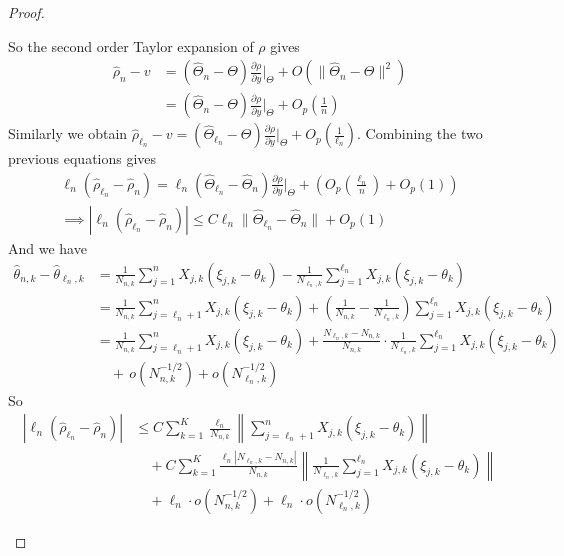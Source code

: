 \begin{proof}
\begin{enumerate}[label=(\roman*)]
		So the second order Taylor expansion of \(\rho\) gives
		\begin{align}
			\hat{\rho}_n - v  &= (\hat{\Theta}_n-\Theta)\frac{\partial \rho}{\partial y}\Big|_{\Theta} + O(\|\hat{\Theta}_n-\Theta\|^2) \\
			&= (\hat{\Theta}_n-\Theta)\frac{\partial \rho}{\partial y}\Big|_{\Theta} + O_p\left(\frac{1}{n}\right) \label{eq:approx-rho-Op}
		\end{align}
		Similarly we obtain \(		\hat{\rho}_{\ell_n} - v = (\hat{\Theta}_{\ell_n}-\Theta)\frac{\partial \rho}{\partial y}\Big|_{\Theta} + O_p\left(\frac{1}{\ell_n}\right)
		\).	Combining the two previous equations gives
		\begin{eqnarray*}
			\ell_n(\hat{\rho}_{\ell_n}-\hat{\rho}_n) = \ell_n(\hat{\Theta}_{\ell_n}-\hat{\Theta}_n)\frac{\partial \rho}{\partial y}\Big|_{\Theta} + \left(O_p\left(\frac{\ell_n}{n}\right)+O_p(1)\right) \\
			\implies |\ell_n(\hat{\rho}_{\ell_n}-\hat{\rho}_n)| \le C \ell_n \|\hat{\Theta}_{\ell_n}-\hat{\Theta}_n\| + O_p(1)
		\end{eqnarray*}
		And we have	
		\begin{align*}
			\hat{\theta}_{n,k}-\hat{\theta}_{\ell_n,k} &= \frac{1}{N_{n,k}}\sum_{j=1}^{n}X_{j,k}(\xi_{j,k}-\theta_k)-\frac{1}{N_{\ell_n,k}}\sum_{j=1}^{\ell_n}X_{j,k}(\xi_{j,k}-\theta_k)\\
			&= \frac{1}{N_{n,k}}\sum_{j=\ell_n+1}^{n} X_{j,k}(\xi_{j,k}-\theta_k) + \left(\frac{1}{N_{n,k}} - \frac{1}{N_{\ell_n,k}}\right)\sum_{j=1}^{\ell_n}X_{j,k}(\xi_{j,k}-\theta_k)\\[8pt]
			&= \frac{1}{N_{n,k}}\sum_{j=\ell_n+1}^{n}X_{j,k}(\xi_{j,k}-\theta_k) + \frac{N_{\ell_n,k}-N_{n,k}}{N_{n,k}}\cdot\frac{1}{N_{\ell_n,k}}\sum_{j=1}^{\ell_n}X_{j,k}(\xi_{j,k}-\theta_k)\\[8pt]
			&\quad +\, o\left(N_{n,k}^{-1/2}\right) + o\left(N_{\ell_n,k}^{-1/2}\right)
		\end{align*}
		So
		\begin{align*}
			|\ell_n(\hat{\rho}_{\ell_n}-\hat{\rho}_n)| &\le C\sum_{k=1}^{K}\frac{\ell_n}{N_{n,k}}\left\|\sum_{j=\ell_n+1}^{n}X_{j,k}(\xi_{j,k}-\theta_k)\right\|\\
			&\quad + C\sum_{k=1}^{K}\frac{\ell_n|N_{\ell_n,k}-N_{n,k}|}{N_{n,k}}\left\|\frac{1}{N_{\ell_n,k}}\sum_{j=1}^{\ell_n}X_{j,k}(\xi_{j,k}-\theta_k)\right\|\\
			&\quad + \ell_n \cdot o\left(N_{n,k}^{-1/2}\right) + \ell_n \cdot o\left(N_{\ell_n,k}^{-1/2}\right)
		\end{align*}

\end{enumerate}
\end{proof}
